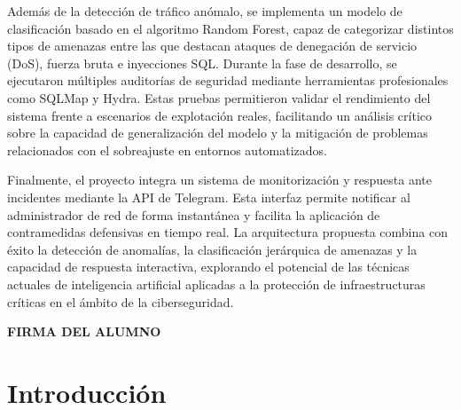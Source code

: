 \documentclass[12pt]{article}
\newcommand{\helveticatitle}{%
    \fontfamily{phv}\selectfont 
}
\numberwithin{equation}{section} %
\begin{document}
    \vspace{5mm}

    Además de la detección de tráfico anómalo, se implementa un modelo de clasificación basado en el algoritmo Random Forest, capaz de categorizar distintos tipos de amenazas entre las que destacan ataques de denegación de servicio (DoS), fuerza bruta e inyecciones SQL. Durante la fase de desarrollo, se ejecutaron múltiples auditorías de seguridad mediante herramientas profesionales como SQLMap y Hydra. Estas pruebas permitieron validar el rendimiento del sistema frente a escenarios de explotación reales, facilitando un análisis crítico sobre la capacidad de generalización del modelo y la mitigación de problemas relacionados con el sobreajuste en entornos automatizados.

    \vspace{5mm}

    Finalmente, el proyecto integra un sistema de monitorización y respuesta ante incidentes mediante la API de Telegram. Esta interfaz permite notificar al administrador de red de forma instantánea y facilita la aplicación de contramedidas defensivas en tiempo real. La arquitectura propuesta combina con éxito la detección de anomalías, la clasificación jerárquica de amenazas y la capacidad de respuesta interactiva, explorando el potencial de las técnicas actuales de inteligencia artificial aplicadas a la protección de infraestructuras críticas en el ámbito de la ciberseguridad.

    \vspace{1cm}

    {\fontsize{12}{20}\selectfont
    \noindent \hspace{12cm}\textbf{\helveticatitle FIRMA DEL ALUMNO}}
    
    \newpage
    \thispagestyle{empty}
    \mbox{}

    \tableofcontents

    \newpage
    \thispagestyle{empty}
    \mbox{}

    \listoffigures

    \newpage
    \thispagestyle{empty}
    \mbox{}





    \newpage
    \thispagestyle{empty}
    \mbox{}

    \thispagestyle{empty}

    \section{Introducción}\label{sec: introduccion}
\end{document}
